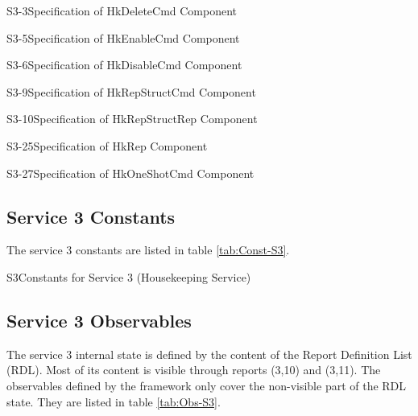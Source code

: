 \documentclass{pnp_article}
\begin{document}
\begin{cr_cmd}{S3-3}{Specification of HkDeleteCmd Component}
\end{cr_cmd}

\newpage
\begin{cr_cmd}{S3-5}{Specification of HkEnableCmd Component}
\end{cr_cmd}

\begin{cr_cmd}{S3-6}{Specification of HkDisableCmd Component}
\end{cr_cmd}

\newpage
\begin{cr_cmd}{S3-9}{Specification of HkRepStructCmd Component}
\end{cr_cmd}

\begin{cr_rep}{S3-10}{Specification of HkRepStructRep Component}
\end{cr_rep}

\newpage
\begin{cr_rep}{S3-25}{Specification of HkRep Component}
\end{cr_rep}

\begin{cr_cmd}{S3-27}{Specification of HkOneShotCmd Component}
\end{cr_cmd}

\newpage 
\subsection{Service 3 Constants}\label{sec:serv3Const}
The service 3 constants are listed in table \ref{tab:Const-S3}.

\begin{cr_const}{S3}{Constants for Service 3 (Housekeeping Service)}
\end{cr_const}


\subsection{Service 3 Observables}\label{sec:serv3Obs}
The service 3 internal state is defined by the content of the Report Definition List (RDL). Most of its content is visible through reports (3,10) and (3,11). The observables defined by the framework only cover the non-visible part of the RDL state. They are listed in table \ref{tab:Obs-S3}.
\end{document}
